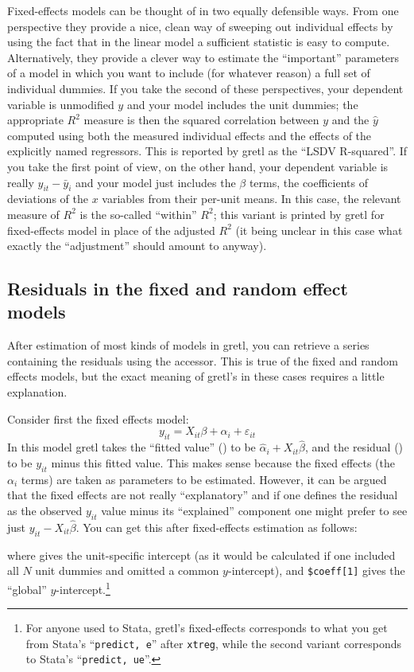 Fixed-effects models can be thought of in two equally defensible ways.
From one perspective they provide a nice, clean way of sweeping out
individual effects by using the fact that in the linear model a
sufficient statistic is easy to compute. Alternatively, they provide a
clever way to estimate the ``important'' parameters of a model in
which you want to include (for whatever reason) a full set of
individual dummies.  If you take the second of these perspectives,
your dependent variable is unmodified $y$ and your model includes the
unit dummies; the appropriate $R^2$ measure is then the squared
correlation between $y$ and the $\hat{y}$ computed using both the
measured individual effects and the effects of the explicitly named
regressors. This is reported by gretl as the ``LSDV R-squared''. If
you take the first point of view, on the other hand, your dependent
variable is really $y_{it} - \bar{y}_i$ and your model just includes
the $\beta$ terms, the coefficients of deviations of the $x$ variables
from their per-unit means. In this case, the relevant measure of $R^2$
is the so-called ``within'' $R^2$; this variant is printed by gretl
for fixed-effects model in place of the adjusted $R^2$ (it being
unclear in this case what exactly the ``adjustment'' should amount to
anyway).

\subsection{Residuals in the fixed and random effect models}
\label{panel-uhat}

After estimation of most kinds of models in gretl, you can retrieve
a series containing the residuals using the  accessor.
This is true of the fixed and random effects models, but the exact
meaning of gretl's  in these cases requires a little
explanation.

Consider first the fixed effects model:
\[
y_{it} = X_{it}\beta + \alpha_i + \varepsilon_{it}
\]
In this model gretl takes the ``fitted value'' () to be
$\hat{\alpha}_i + X_{it}\hat{\beta}$, and the residual ()
to be $y_{it}$ minus this fitted value. This makes sense because the
fixed effects (the $\alpha_i$ terms) are taken as parameters to be
estimated. However, it can be argued that the fixed effects are not
really ``explanatory'' and if one defines the residual as the observed
$y_{it}$ value minus its ``explained'' component one might prefer to
see just $y_{it} - X_{it}\hat{\beta}$. You can get this after
fixed-effects estimation as follows:
%
%
where  gives the unit-specific intercept (as it would be
calculated if one included all
$N$ unit dummies and omitted a common
$y$-intercept), and \verb|$coeff[1]| gives the ``global''
$y$-intercept.\footnote{For anyone used to Stata, gretl's
  fixed-effects  corresponds to what you get from Stata's
  ``\texttt{predict, e}'' after \texttt{xtreg}, while the second
  variant corresponds to Stata's ``\texttt{predict, ue}''.}

